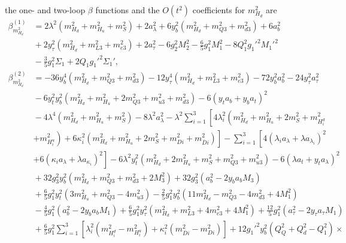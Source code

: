 \documentclass[preprint,amsmath,amssymb,aps,superscriptaddress,prd,showpacs,floatfix,nofootinbib]{revtex4-1}
\begin{document}
the one- and two-loop $\beta$ functions and the $O(t^2)$ coefficients for $m_{H_d}^2$ are
\begin{subequations}
\begin{align}
\beta_{m_{H_d}^2}^{(1)}&=2\lambda^2\left ( m_{H_d}^2+m_{H_u}^2+m_S^2\right )+2a_\lambda^2+6y_b^2\left ( m_{H_d}^2+m_{Q3}^2+m_{d3}^2\right )+6a_b^2\nonumber\\
&{}+2y_\tau^2\left ( m_{H_d}^2+m_{L3}^2+m_{e3}^2\right )+2a_\tau^2-6g_2^2 M_2^2-\frac{6}{5}g_1^2 M_1^2-8Q_1^2g_1'^2 M_1'^2\nonumber\\
&{}-\frac{3}{5}g_1^2\Sigma_1+2Q_1g_1'^2\Sigma_1',\label{eq:USSMmHd2BetaOneLoop}\\
\beta_{m_{H_d}^2}^{(2)}&=-36y_b^4\left ( m_{H_d}^2+m_{Q3}^2+m_{d3}^2\right )-12y_\tau^4\left ( m_{H_d}^2+m_{L3}^2+m_{e3}^2\right )-72y_b^2a_b^2-24y_\tau^2a_\tau^2\nonumber\\
&{}-6y_t^2y_b^2\left ( m_{H_d}^2+m_{H_u}^2+2m_{Q3}^2+m_{u3}^2+m_{d3}^2\right )-6\left ( y_t a_b+y_ba_t\right )^2\nonumber\\
&{}-4\lambda^4\left ( m_{H_d}^2+m_{H_u}^2+m_S^2\right )-8\lambda^2a_\lambda^2-\lambda^2\sum_{i=1}^3\left [ 4\lambda_i^2\left ( m_{H_d}^2+m_{H_u}^2+2m_S^2+m_{H_i^d}^2\right.\right.\nonumber\\
&{}\left.\left.+m_{H_i^u}^2\right )+6\kappa_i^2\left ( m_{H_d}^2+m_{H_u}^2+2m_S^2+m_{Di}^2+m_{\overline{D}i}^2\right )\right ]-\sum_{i=1}^3\left [ 4\left ( \lambda_i a_{\lambda}+\lambda a_{\lambda_i}\right )^2\right.\nonumber\\
&{}\left.+6\left ( \kappa_ia_\lambda+\lambda a_{\kappa_i}\right )^2\right ]-6\lambda^2y_t^2\left ( m_{H_d}^2+2m_{H_u}^2+m_S^2+m_{Q3}^2+m_{u3}^2\right )-6\left ( \lambda a_t+y_ta_\lambda\right )^2\nonumber\\
&{}+32g_3^2y_b^2\left ( m_{H_d}^2+m_{Q3}^2+m_{d3}^2+2M_3^2\right )+32g_3^2\left ( a_b^2-2y_ba_bM_3\right )\nonumber\\
&{}+\frac{6}{5}g_1^2y_t^2\left ( 3m_{H_u}^2+m_{Q3}^2-4m_{u3}^2\right )-\frac{2}{5}g_1^2y_b^2\left ( 11m_{H_d}^2-m_{Q3}^2-4m_{d3}^2+4M_1^2\right )\nonumber\\
&{}-\frac{4}{5}g_1^2\left ( a_b^2-2y_ba_bM_1\right )+\frac{6}{5}g_1^2y_\tau^2\left ( m_{H_d}^2+m_{L3}^2+4m_{e3}^2+4M_1^2\right )+\frac{12}{5}g_1^2\left ( a_\tau^2-2y_\tau a_\tau M_1\right )\nonumber\\
&{}+\frac{6}{5}g_1^2\sum_{i=1}^3\left [ \lambda_i^2\left ( m_{H_i^d}^2-m_{H_i^u}^2\right )+\kappa_i^2\left ( m_{\overline{D}i}^2-m_{Di}^2\right )\right ]+12g_1'^2y_b^2\left ( Q_Q^2+Q_d^2-Q_1^2\right )\times\nonumber\\

\end{align}
\end{subequations}
\end{document}
